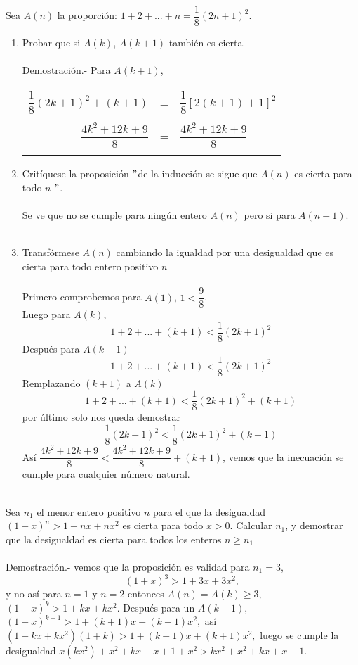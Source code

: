 \begin{ej}
Sea $A(n)$ la proporción: $1+2+...+n=\dfrac{1}{8} (2n+1)^2$.
\begin{enumerate}[\bfseries a)]
\item Probar que si $A(k)$, $A(k+1)$ también es cierta.\\\\
Demostración.- \; Para $A(k+1)$, 
\begin{center}
\begin{tabular}{r c l}
$\dfrac{1}{8}(2k+1)^2+(k+1)$&=&$\dfrac{1}{8}\left[2(k+1)+1\right]^2$\\\\
$\dfrac{4k^2+12k+9}{8}$&=&$\dfrac{4k^2+12k+9}{8}$\\\\
\end{tabular}
\end{center}
\item Critíquese la proposición $"$de la inducción se sigue que $A(n)$ es cierta para todo $n$ $"$.\\\\
Se ve que no se cumple para ningún entero $A(n)$ pero si para $A(n+1)$.\\\\ 
\item Transfórmese $A(n)$ cambiando la igualdad por una desigualdad que es cierta para todo entero positivo $n$\\\\
Primero comprobemos para $A(1)$, \; $1<\dfrac{9}{8}$.\\
Luego para $A(k),$ $$1+2+...+(k+1)<\dfrac{1}{8}(2k+1)^2$$
Después para $A(k+1)$ $$1+2+...+(k+1)<\dfrac{1}{8}(2k+1)^2$$
Remplazando $(k+1)$ a $A(k)$ $$1+2+...+(k+1)<\dfrac{1}{8}(2k+1)^2+(k+1)$$
por último solo nos queda demostrar $$\dfrac{1}{8}(2k+1)^2<\dfrac{1}{8}(2k+1)^2+(k+1)$$
Así $\dfrac{4k^2+12k+9}{8}<\dfrac{4k^2+12k+9}{8} +(k+1)$, vemos que la inecuación se cumple para cualquier número natural.\\\\ 
\end{enumerate} 
\end{ej}

\begin{ej}
Sea $n_1$ el menor entero positivo $n$ para el que la desigualdad $(1+x)^n>1+nx+nx^2$ es cierta para todo $x>0$. Calcular $n_1$, y demostrar que la desigualdad es cierta para todos los enteros $n\geq n_1$\\\\
Demostración.- \; vemos que la proposición es validad para $n_1=3$, $$(1+x)^3>1+3x+3x^2,$$ y no así para $n=1$ \; y \;$n=2$ entonces $A(n)=A(k)\geq 3$, $(1+x)^k>1+kx+kx^2.$ Después para un $A(k+1)$, $(1+x)^{k+1}>1+(k+1)x+(k+1)x^2,$ así \; $(1+kx+kx^2)(1+k)>1+(k+1)x+(k+1)x^2,$ luego se cumple la desigualdad $x(kx^2)+x^2+kx+x+1+x^2>kx^2+x^2+kx+x+1$.\\\\
\end{ej}

